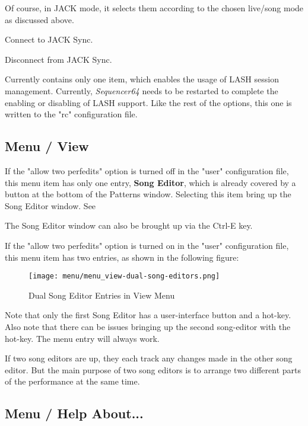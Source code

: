    Of course, in JACK mode,
   it selects them according to the chosen live/song mode as discussed above.

   Connect to JACK Sync.

   Disconnect from JACK Sync.

   Currently contains only one item, which enables the usage of LASH session
   management.
   Currently, \textsl{Sequencer64} needs to be restarted to complete the
   enabling or disabling of LASH support.
   Like the rest of the options, this one is written to the "rc" configuration
   file.

\subsection{Menu / View}
\label{subsec:seq64_menu_view}

   If the "allow two perfedits" option is turned off in the "user"
   configuration file, this menu item has only one entry, \textbf{Song Editor}, 
   which is already covered by a button at the bottom of the Patterns
   window.  Selecting this item bring up the Song Editor window.
   See 

   The Song Editor window can also be brought up via the
   Ctrl-E key.

   If the "allow two perfedits" option is turned on in the "user"
   configuration file, this menu item has two entries, as shown in the
   following figure:

\begin{figure}[H]
   \centering 
   \texttt{[image: menu/menu\_view-dual-song-editors.png]}
   \caption{Dual Song Editor Entries in View Menu}
   \label{fig:seq64_menu_view_song_editors}
\end{figure}

   Note that only the first Song Editor has a user-interface button and
   a hot-key.  Also note that there can be issues bringing up the second
   song-editor with the hot-key.  The menu entry will always work.

   If two song editors are up, they each track any changes made in the other
   song editor.  But the main purpose of two song editors is to arrange two
   different parts of the performance at the same time.

\subsection{Menu / Help About...}
\label{subsec:seq64_menu_about}


